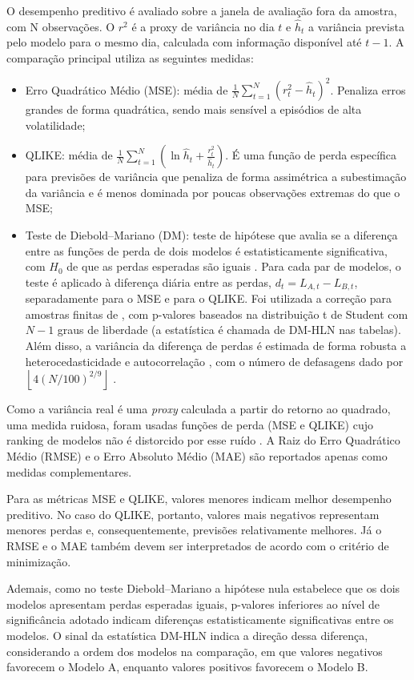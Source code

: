 O desempenho preditivo é avaliado sobre a janela de avaliação fora da amostra, com N observações. O $r^2$ é a proxy de variância no dia $t$ e $\hat{h}_t$ a variância prevista pelo modelo para o mesmo dia, calculada com informação disponível até \(t-1\). A comparação principal utiliza as seguintes medidas:
\begin{itemize}
    \item Erro Quadrático Médio (MSE): média de $\frac{1}{N}\sum_{t=1}^{N}\left(r_t^2-\hat{h}_t\right)^2$. Penaliza erros grandes de forma quadrática, sendo mais sensível a episódios de alta volatilidade;
    \item QLIKE: média de $\frac{1}{N}\sum_{t=1}^{N}\left(\ln \hat{h}_t+\frac{r_t^2}{\hat{h}_t}\right)$.    É uma função de perda específica para previsões de variância que penaliza de forma assimétrica a subestimação da variância e é menos dominada por poucas observações extremas do que o MSE;
    \item Teste de Diebold–Mariano (DM): teste de hipótese que avalia se a diferença entre as funções de perda de dois modelos é estatisticamente significativa, com $H_0$ de que as perdas esperadas são iguais \cite{diebold1995comparing}. Para cada par de modelos, o teste é aplicado à diferença diária entre as perdas, 
    $d_t = L_{A,t} - L_{B,t}$, separadamente para o MSE e para o QLIKE. Foi utilizada a correção para amostras finitas de \textcite{harvey1997testing}, com p-valores baseados na distribuição t de Student com \(N-1\) graus de liberdade (a estatística é chamada de DM-HLN nas tabelas). Além disso, a variância da diferença de perdas 
    é estimada de forma robusta a heterocedasticidade e autocorrelação \cite{newey1987simple}, com o número de defasagens dado por $\left\lfloor 4 \left( N/100 \right)^{2/9} \right\rfloor$ \cite{newey1994automatic}.
\end{itemize}

Como a variância real é uma \textit{proxy} calculada a partir do retorno ao quadrado, uma medida ruidosa, foram usadas funções de perda (MSE e QLIKE) cujo ranking de modelos não é distorcido por esse ruído \cite{patton2011volatility}. A Raiz do Erro Quadrático Médio (RMSE) e o Erro Absoluto Médio (MAE) são reportados apenas como medidas complementares.

Para as métricas MSE e QLIKE, valores menores indicam melhor desempenho preditivo. No caso do QLIKE, portanto, valores mais negativos representam menores perdas e, consequentemente, previsões relativamente melhores. Já o RMSE e o MAE também devem ser interpretados de acordo com o critério de minimização.

Ademais, como no teste Diebold–Mariano a hipótese nula estabelece que os dois modelos apresentam perdas esperadas iguais, p-valores inferiores ao nível de significância adotado indicam diferenças estatisticamente significativas entre os modelos. O sinal da estatística DM-HLN indica a direção dessa diferença, considerando a ordem dos modelos na 
comparação, em que valores negativos favorecem o Modelo A, enquanto valores positivos favorecem o Modelo B.
